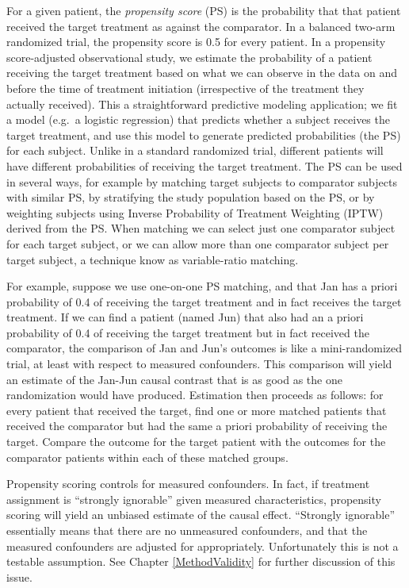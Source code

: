 \documentclass[11pt]{book}
\theoremstyle{definition}
\theoremstyle{definition}
\theoremstyle{definition}
\theoremstyle{remark}
\begin{document}
For a given patient, the \emph{propensity score} (PS) is the probability that that patient received the target treatment as against the comparator. \citep{rosenbaum_1983} In a balanced two-arm randomized trial, the propensity score is 0.5 for every patient. In a propensity score-adjusted observational study, we estimate the probability of a patient receiving the target treatment based on what we can observe in the data on and before the time of treatment initiation (irrespective of the treatment they actually received). This a straightforward predictive modeling application; we fit a model (e.g.~a logistic regression) that predicts whether a subject receives the target treatment, and use this model to generate predicted probabilities (the PS) for each subject. Unlike in a standard randomized trial, different patients will have different probabilities of receiving the target treatment. The PS can be used in several ways, for example by matching target subjects to comparator subjects with similar PS, by stratifying the study population based on the PS, or by weighting subjects using Inverse Probability of Treatment Weighting (IPTW) derived from the PS. When matching we can select just one comparator subject for each target subject, or we can allow more than one comparator subject per target subject, a technique know as variable-ratio matching. \citep{rassen_2012}

For example, suppose we use one-on-one PS matching, and that Jan has a priori probability of 0.4 of receiving the target treatment and in fact receives the target treatment. If we can find a patient (named Jun) that also had an a priori probability of 0.4 of receiving the target treatment but in fact received the comparator, the comparison of Jan and Jun's outcomes is like a mini-randomized trial, at least with respect to measured confounders. This comparison will yield an estimate of the Jan-Jun causal contrast that is as good as the one randomization would have produced. Estimation then proceeds as follows: for every patient that received the target, find one or more matched patients that received the comparator but had the same a priori probability of receiving the target. Compare the outcome for the target patient with the outcomes for the comparator patients within each of these matched groups.

Propensity scoring controls for measured confounders. In fact, if treatment assignment is ``strongly ignorable'' given measured characteristics, propensity scoring will yield an unbiased estimate of the causal effect. ``Strongly ignorable'' essentially means that there are no unmeasured confounders, and that the measured confounders are adjusted for appropriately. Unfortunately this is not a testable assumption. See Chapter \ref{MethodValidity} for further discussion of this issue.
\end{document}
